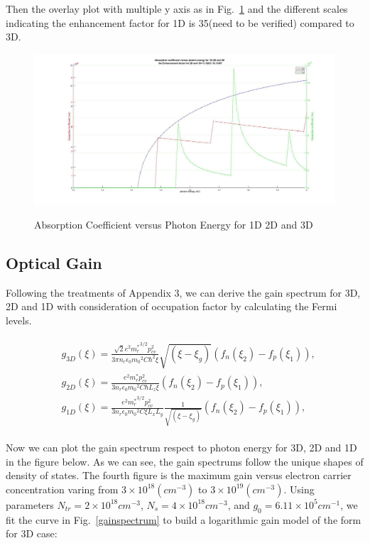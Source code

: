 Then the overlay plot with multiple y axis as in Fig.~\ref{absrate_overlay} and
the different scales indicating the enhancement factor for 1D is 35(need to be
verified) compared to 3D.

\begin{figure}
  \caption{Absorption Coefficient versus Photon Energy for 1D 2D and 3D}
  \centering
  \includegraphics[width=\textwidth]{pictures/LT/absrate_overlay}
  \label{absrate_overlay}
\end{figure}

\subsection{Optical Gain}

Following the treatments of Appendix 3, we can derive the gain spectrum for 3D,
2D and 1D with consideration of occupation factor by calculating the Fermi
levels.

\begin{eqnarray}
\begin{aligned}
  & g_{3D}(\xi)=\frac{\sqrt{2}e^2{m_r^\ast}^{3/2}{p_{cv}^2}}{3{\pi}n_r\epsilon_0{m_0}^2C{\hbar^2}\xi}{\sqrt{(\xi-\xi_g)}}(f_n(\xi_2)-f_p(\xi_1)),
\\
& g_{2D}(\xi)=\frac{e^2{m_r^\ast}{p_{cv}^2}}{3{n_r}\epsilon_0{m_0}^2C{\hbar}L_z\xi}(f_n(\xi_2)-f_p(\xi_1)),
\\
& g_{1D}(\xi)=\frac{e^2{m_r^\ast}^{3/2}{p_{cv}^2}}{3{n_r}\epsilon_0{m_0}^2C\xi{L_x}{L_y}}\frac{1}{\sqrt{(\xi-\xi_g)}}(f_n(\xi_2)-f_p(\xi_1)),
\end{aligned}
\label{eq:five}
\end{eqnarray}

Now we can plot the gain spectrum respect to photon energy for 3D, 2D and 1D in
the figure below. As we can see, the gain spectrums follow the unique shapes of
density of states. The fourth figure is the maximum gain versus electron
carrier concentration varing from $3\times10^{18} (cm^{-3})$ to
$3\times10^{19}(cm^{-3})$. Using parameters $N_{tr} = 2\times10^{18} cm^{-3}$,
$N_{s} = 4\times10^{18} cm^{-3}$, and $g_0 = 6.11\times10^{5} cm^{-1}$, we fit
the curve in Fig.~\ref{gainspectrum} to build a logarithmic gain model of the
form for 3D case:

